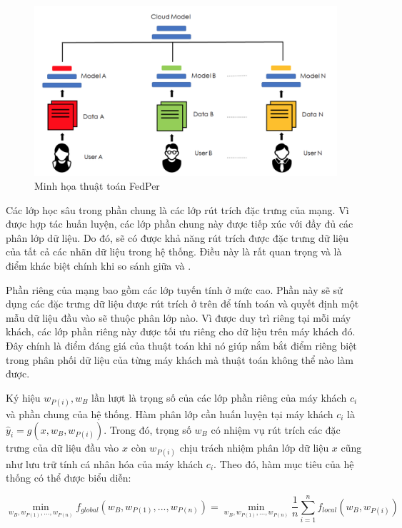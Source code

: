 \begin{figure}[H]
    \centering
    \includegraphics[scale=0.8]{../images/perlayer.png}
    \caption{Minh họa thuật toán FedPer \cite{arivazhagan2019federated}}
    \label{fig:fedper}
\end{figure}

Các lớp học sâu trong phần chung là các lớp rút trích đặc trưng của mạng. Vì được hợp tác huấn luyện, các lớp phần chung này được tiếp xúc với đầy đủ các phân lớp dữ liệu. Do đó, sẽ có được khả năng rút trích được đặc trưng dữ liệu của tất cả các nhãn dữ liệu trong hệ thống. Điều này là rất quan trọng và là điểm khác biệt chính khi so sánh giữa  và .

Phần riêng của mạng bao gồm các lớp tuyến tính ở mức cao. Phần này sẽ sử dụng các đặc trưng dữ liệu được rút trích ở trên để tính toán và quyết định một mẫu dữ liệu đầu vào sẽ thuộc phân lớp nào. Vì được duy trì riêng tại mỗi máy khách, các lớp phần riêng này được tối ưu riêng cho dữ liệu trên máy khách đó. Đây chính là điểm đáng giá của thuật toán  khi nó giúp nắm bắt điểm riêng biệt trong phân phối dữ liệu của từng máy khách mà thuật toán  không thể nào làm được.

Ký hiệu $w_{P(i)}, w_B$ lần lượt là trọng số của các lớp phần riêng của máy khách $c_i$ và phần chung của hệ thống. Hàm phân lớp cần huấn luyện tại máy khách $c_i$ là $\hat{y}_i = g(x, w_B, w_{P(i)})$. Trong đó, trọng số $w_B$ có nhiệm vụ rút trích các đặc trưng của dữ liệu đầu vào $x$ còn $w_{P(i)}$ chịu trách nhiệm phân lớp dữ liệu $x$ cũng như lưu trữ tính cá nhân hóa của máy khách $c_i$. Theo đó, hàm mục tiêu của hệ thống có thể được biểu diễn:

\begin{dmath}
    \min_{w_B, w_{P(1)},...,w_{P(n)}} f_{global}(w_B, w_{P(1)},...,w_{P(n)}) = \min_{w_B, w_{P(1)},...,w_{P(n)}} \frac{1}{n} \sum_{i=1}^n f_{local}(w_B, w_{P(i)})
\end{dmath}

